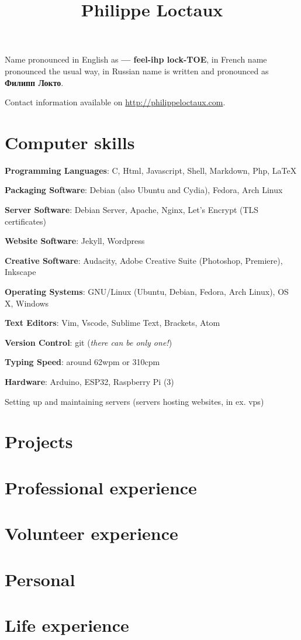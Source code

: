 \documentclass[a4paper]{article}
\title{Philippe Loctaux}
\date{\vspace{-5ex}}
\begin{document}
\maketitle

Name pronounced in English as \textbf{ — feel-ihp lock-TOE}, in French name pronounced the usual way, in Russian name is written and pronounced as \textbf{Филипп Локто}.

Contact information available on \url{http://philippeloctaux.com}.

\section*{Computer skills}

\begin{description}
	\item \textbf{Programming Languages}: C, Html, Javascript, Shell, Markdown, Php, \LaTeX
	\item \textbf{Packaging Software}: Debian (also Ubuntu and Cydia), Fedora, Arch Linux
	\item \textbf{Server Software}: Debian Server, Apache, Nginx, Let's Encrypt (TLS certificates)
	\item \textbf{Website Software}: Jekyll, Wordpress
	\item \textbf{Creative Software}: Audacity, Adobe Creative Suite (Photoshop, Premiere), Inkscape
	\item \textbf{Operating Systems}: GNU/Linux (Ubuntu, Debian, Fedora, Arch Linux), OS X, Windows
	\item \textbf{Text Editors}: Vim, Vscode, Sublime Text, Brackets, Atom
	\item \textbf{Version Control}: git (\textit{there can be only one!})
	\item \textbf{Typing Speed}: around 62wpm or 310cpm
	\item \textbf{Hardware}: Arduino, ESP32, Raspberry Pi (3)
	\item Setting up and maintaining servers (servers hosting websites, in ex. vps)
\end{description}

\section*{Projects}
\section*{Professional experience}
\section*{Volunteer experience}
\section*{Personal}
\section*{Life experience}
\end{document}

